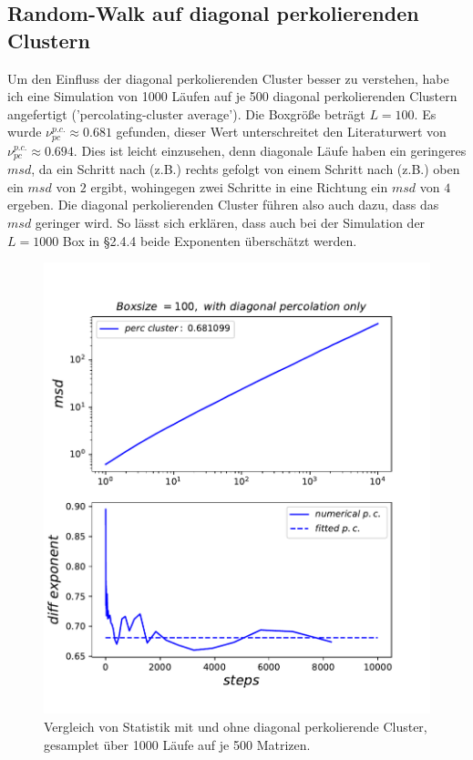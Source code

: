 \documentclass[a4paper, 12pt]{report}
\begin{document}
\subsection{Random-Walk auf diagonal perkolierenden Clustern}
Um den Einfluss der diagonal perkolierenden Cluster besser zu verstehen, habe ich eine Simulation von 1000 Läufen auf je 500 diagonal perkolierenden Clustern angefertigt ('percolating-cluster average'). Die Boxgröße beträgt $L=100$. Es wurde $\nu_{pc}^{p.c.} \approx 0.681$ gefunden, dieser Wert unterschreitet den Literaturwert von $\nu_{pc}^{p.c.} \approx 0.694$. Dies ist leicht einzusehen, denn diagonale Läufe haben ein geringeres $msd$, da ein Schritt nach (z.B.) rechts gefolgt von einem Schritt nach (z.B.) oben ein $msd$ von $2$ ergibt, wohingegen zwei Schritte in eine Richtung ein $msd$ von $4$ ergeben. Die diagonal perkolierenden Cluster führen also auch dazu, dass das $msd$ geringer wird. So lässt sich erklären, dass auch bei der Simulation der $L=1000$ Box in §2.4.4 beide Exponenten überschätzt werden.

\begin{figure}[h!]
	\centering
	\includegraphics[scale=0.9]{diagpc100.pdf}
	\caption{Vergleich von Statistik mit und ohne diagonal perkolierende Cluster, gesamplet über 1000 Läufe auf je 500 Matrizen.}
\end{figure}
\end{document}
